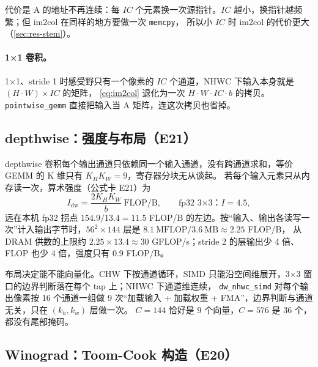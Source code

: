 \documentclass[11pt,a4paper]{ctexart}
\begin{document}
代价是 A 的地址不再连续：每 $IC$ 个元素换一次源指针。$IC$ 越小，换指针越频繁；但 im2col 在同样的地方要做一次 \texttt{memcpy}，
所以小 $IC$ 时 im2col 的代价更大（\cref{sec:res-stem}）。

\paragraph{1×1 卷积。} 1×1、stride 1 时感受野只有一个像素的 $IC$ 个通道，NHWC 下输入本身就是 $(H\cdot W)\times IC$ 的矩阵，
\cref{eq:im2col} 退化为一次 $H\cdot W\cdot IC\cdot b$ 的拷贝。\texttt{pointwise\_gemm} 直接把输入当 A 矩阵，连这次拷贝也省掉。

\subsection{depthwise：强度与布局（E21）}

depthwise 卷积每个输出通道只依赖同一个输入通道，没有跨通道求和，等价 GEMM 的 K 维只有 $K_HK_W = 9$，寄存器分块无从谈起。
若每个输入元素只从内存读一次，算术强度（公式卡 E21）为
\begin{equation}
  I_\text{dw} = \frac{2K_HK_W}{b}\ \text{FLOP/B}, \qquad \text{fp32 3×3：} I = 4.5,\label{eq:dw}
\end{equation}
远在本机 fp32 拐点 $154.9/13.4 = 11.5$ FLOP/B 的左边。按“输入、输出各读写一次”计入输出字节时，$56^2\times144$ 层是 $8.1\ \text{MFLOP} / 3.6\ \text{MB} \approx 2.25$ FLOP/B，
从 DRAM 供数的上限约 $2.25\times13.4\approx30$ GFLOP/s；stride 2 的层输出少 4 倍、FLOP 也少 4 倍，强度只有 0.9 FLOP/B。

布局决定能不能向量化。CHW 下按通道循环，SIMD 只能沿空间维展开，3×3 窗口的边界判断落在每个 tap 上；NHWC 下通道维连续，
\texttt{dw\_nhwc\_simd} 对每个输出像素按 16 个通道一组做 9 次“加载输入 + 加载权重 + FMA”，边界判断与通道无关，只在 $(k_h,k_w)$ 层做一次。
$C = 144$ 恰好是 9 个向量，$C = 576$ 是 36 个，都没有尾部掩码。

\subsection{Winograd：Toom-Cook 构造（E20）}\label{sec:toomcook}
\end{document}
